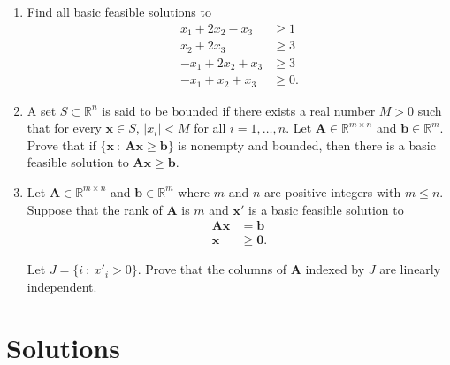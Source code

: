\documentclass[]{book}
\def\lt{<}
\def\gt{>}
\newcommand{\RR}{\mathbb{R}}
\newcommand{\ssep}{~:~}
\newcommand{\mm}[1]{\mathbf{#1}}
\renewcommand{\vec}[1]{\mathbf{#1}}
\theoremstyle{definition}
\theoremstyle{definition}
\theoremstyle{remark}
\begin{document}
\begin{enumerate}
\def\labelenumi{\arabic{enumi}.}
\item
  Find all basic feasible solutions to
  \begin{align*}
    x_1 + 2x_2 - x_3 & \geq 1\\ 
    x_2 + 2x_3 & \geq 3 \\ 
    -x_1 + 2x_2 + x_3 & \geq 3 \\ 
   - x_1 + x_2 + x_3 & \geq 0.\end{align*}
\item
  A set \(S \subset \RR^n\) is said to be bounded if there exists a real
  number \(M \gt 0\) such that for every \(\vec{x} \in S\),
  \(|x_i| \lt M\) for all \(i = 1,\ldots, n\). Let
  \(\mm{A} \in\RR^{m\times n}\) and \(\vec{b}\in \RR^m\). Prove that if
  \(\{ \vec{x} \ssep \mm{A} \vec{x} \geq \vec{b}\}\) is nonempty and
  bounded, then there is a basic feasible solution to
  \(\mm{A} \vec{x} \geq \vec{b}\).
\item
  Let \(\mm{A} \in \RR^{m \times n}\) and \(\vec{b} \in \RR^m\) where
  \(m\) and \(n\) are positive integers with \(m \leq n\). Suppose that
  the rank of \(\mm{A}\) is \(m\) and \(\vec{x}'\) is a basic feasible
  solution to
  \begin{align*}
    \mm{A}\vec{x} & = \vec{b} \\
    \vec{x} & \geq \vec{0}.
     \end{align*}

  Let \(J = \{ i \ssep x'_i \gt 0\}\). Prove that the columns of
  \(\mm{A}\) indexed by \(J\) are linearly independent.
\end{enumerate}

\section*{Solutions}\label{solutions-8}
\end{document}
